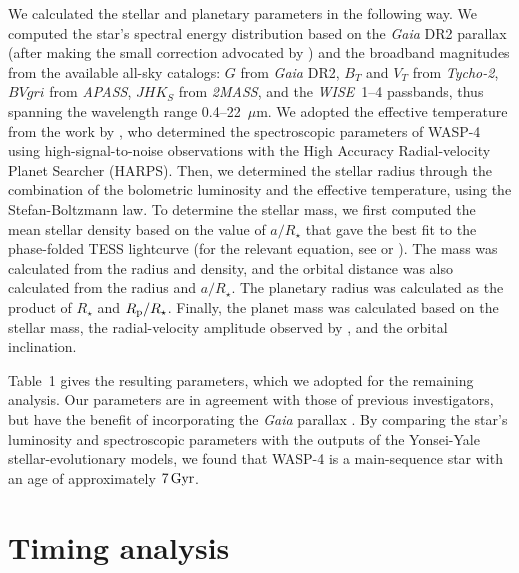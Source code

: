 \documentclass[12pt,twocolumn,tighten]{aastex62}
\begin{document}
We calculated the stellar and planetary parameters in the following
way.  We computed the star's spectral energy distribution based on the
{\it Gaia} DR2 parallax (after making the small correction advocated
by \citealt{stassun_evidence_2018}) and the broadband magnitudes from
the available all-sky catalogs: $G$ from {\it Gaia\/} DR2, $B_T$
and $V_T$ from {\it Tycho-2}, $BVgri$ from {\it APASS}, $JHK_S$ from
{\it 2MASS}, and the {\it WISE}~1--4 passbands, thus spanning the
wavelength range 0.4--22~$\mu$m.  We adopted the effective temperature
from the work by \citet{doyle_accurate_2013}, who determined the
spectroscopic parameters of WASP-4 using high-signal-to-noise
observations with the High Accuracy Radial-velocity Planet Searcher
(HARPS).  Then, we determined the stellar radius through the
combination of the bolometric luminosity and the effective
temperature, using the Stefan-Boltzmann law.  To determine the stellar
mass, we first computed the mean stellar density based on the value of
$a/R_\star$ that gave the best fit to the phase-folded TESS lightcurve
(for the relevant equation, see \citealt{seager_unique_2003} or
\citealt{winn_exoplanet_2010}).  The mass was calculated from the
radius and density, and the orbital distance was also calculated from
the radius and $a/R_\star$.  The planetary radius was calculated as
the product of $R_\star$ and $R_{\rm p}/R_\star$.  Finally, the planet
mass was calculated based on the stellar mass, the radial-velocity
amplitude observed by \citet{triaud_spin-orbit_2010}, and the orbital
inclination.

Table~1 gives the resulting parameters, which we adopted for the
remaining analysis.  Our parameters are in agreement with those of
previous investigators, but have the benefit of incorporating the {\it
Gaia} parallax
\citep{wilson_wasp-4b_2008,gillon_discovery_2009,winn_transit_2009,southworth_homogeneous_2011,petrucci_no_2013,huitson_gemini_2017}.
By comparing the star's luminosity and spectroscopic parameters with
the outputs of the Yonsei-Yale stellar-evolutionary models, we found
that WASP-4 is a main-sequence star with an age of approximately
$7\,{\rm Gyr}$.


\section{Timing analysis}
\label{sec:timing}
\end{document}
